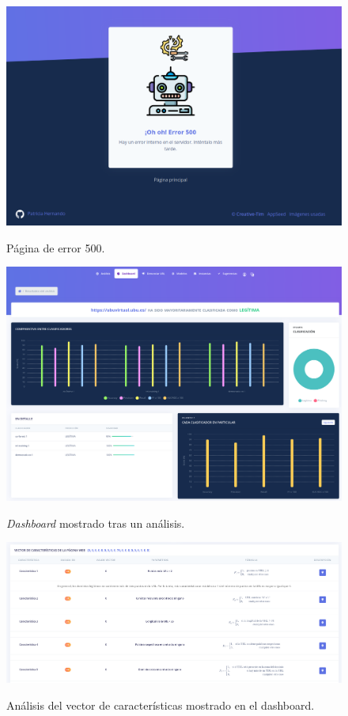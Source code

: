 \begin{figure}[h]
	\caption[Manual de usuario: error 500]{Página de error 500.}
	\centering
	\includegraphics[width=\textwidth]{../img/anexos/user_guide/0_error_500}
	\label{e-0:error-500}
\end{figure}

\begin{figure}[h]
	\caption[Manual de usuario: gráficas del \textit{dashboard}]{\textit{Dashboard} mostrado tras un análisis.}
	\centering
	\includegraphics[width=\textwidth]{../img/anexos/user_guide/3_dashboard_1}
	\label{e-3:dashboard-1}
\end{figure}

\begin{figure}[h]
	\caption[Manual de usuario: vector de características en el \textit{dashboard}]{Análisis del vector de características mostrado en el dashboard.}
	\centering
	\includegraphics[width=\textwidth]{../img/anexos/user_guide/3_dashboard_2}
	\label{e-3:dashboard-2}
\end{figure}

